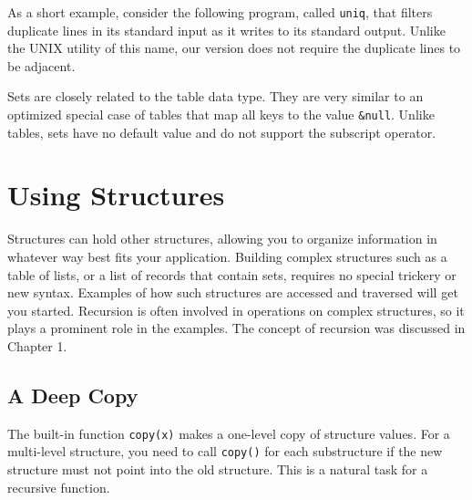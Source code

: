 As a short example, consider the following program, called
\texttt{uniq}, that filters duplicate lines in its standard input as it
writes to its standard output. Unlike the UNIX utility of this name,
our version does not require the duplicate lines to be adjacent.


Sets are closely related to the table data type. They are very similar
to an optimized special case of tables that map all keys to the value
\texttt{\&null}. Unlike tables, sets have no default value and do not
support the subscript operator.

\section{Using Structures}

Structures can hold other structures, allowing you to
organize information in whatever way best fits your application.
Building complex structures such as a table of lists, or a list
of records that contain sets, requires no special trickery or new
syntax. Examples of how such structures are accessed and
traversed will get you started. Recursion is often
involved in operations on complex structures, so it plays a prominent
role in the examples. The concept of recursion was discussed in Chapter
1.

\subsection*{A Deep Copy}

The built-in function \texttt{copy(x)} makes a one-level
copy of structure values. For a multi-level structure, you need to call
\texttt{copy()} for each substructure if the new structure must not
point into the old structure. This is a natural task for
a recursive function.

